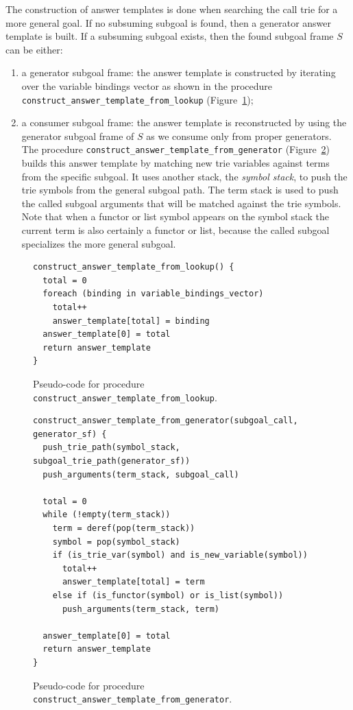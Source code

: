 The construction of answer templates is done when searching the call trie for a more general goal.
If no subsuming subgoal is found, then a generator answer template is built. If a subsuming subgoal
exists, then the found subgoal frame $S$ can be either:

\begin{enumerate}
  \item a generator subgoal frame: the answer template is constructed by iterating over
  the variable bindings vector as shown in the procedure \texttt{construct\_answer\_template\_from\_lookup}
  (Figure~\ref{fig:construct_answer_template_from_lookup});
  
  \item a consumer subgoal frame: the answer template is reconstructed by using the generator
  subgoal frame of $S$ as we consume only from proper generators. 
  The procedure \texttt{construct\_answer\_template\_from\_generator}
  (Figure~\ref{fig:construct_answer_template_from_generator}) builds this answer template by
  matching new trie variables against terms from the specific subgoal. It
  uses another stack, the \textit{symbol stack}, to push the trie
  symbols from the general subgoal path. The term stack is used to push the called subgoal arguments that
  will be matched against the trie symbols. Note that when a functor or list symbol appears
  on the symbol stack the current term is also certainly a functor or list, because the called subgoal
  specializes the more general subgoal.
\end{enumerate}

\begin{figure}[ht]
\begin{Verbatim}
construct_answer_template_from_lookup() {
  total = 0
  foreach (binding in variable_bindings_vector)
    total++
    answer_template[total] = binding
  answer_template[0] = total
  return answer_template
}
\end{Verbatim}
\caption{Pseudo-code for procedure \texttt{construct\_answer\_template\_from\_lookup}.}
\label{fig:construct_answer_template_from_lookup}
\end{figure}

\begin{figure}[ht]
\begin{Verbatim}
construct_answer_template_from_generator(subgoal_call, generator_sf) {
  push_trie_path(symbol_stack, subgoal_trie_path(generator_sf))
  push_arguments(term_stack, subgoal_call)
  
  total = 0
  while (!empty(term_stack))
    term = deref(pop(term_stack))
    symbol = pop(symbol_stack)
    if (is_trie_var(symbol) and is_new_variable(symbol))
      total++
      answer_template[total] = term
    else if (is_functor(symbol) or is_list(symbol))
      push_arguments(term_stack, term)
  
  answer_template[0] = total
  return answer_template
}
\end{Verbatim}
\caption{Pseudo-code for procedure \texttt{construct\_answer\_template\_from\_generator}.}
\label{fig:construct_answer_template_from_generator}
\end{figure}

